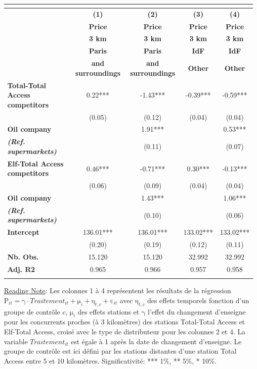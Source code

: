 \documentclass[english]{article}
\begin{document}
\begin{center}
\begin{footnotesize} %
\begin{tabular}{l|cccc}
\multicolumn{1}{l}{} &  &  &  & \tabularnewline
\hline
\hline
 & \textbf{(1)}  & \textbf{(2)}  & \textbf{(3)}  & \textbf{(4) }\tabularnewline
 & \textbf{Price}  & \textbf{Price}  & \textbf{Price}  & \textbf{Price}\tabularnewline
 & \textbf{3 km}  & \textbf{3 km}  & \textbf{3 km}  & \textbf{3 km}\tabularnewline
\hline
 & \textbf{Paris}  & \textbf{Paris}  & \textbf{IdF}  & \textbf{IdF}\tabularnewline
 & \textbf{and surroundings}  & \textbf{and surroundings}  & \textbf{Other}  & \textbf{Other}\tabularnewline
\hline
\textbf{Total-Total Access competitors}  & 0.22{*}{*}{*}  & -1.43{*}{*}{*}  & -0.39{*}{*}{*}  & -0.59{*}{*}{*}\tabularnewline
 & (0.05)  & (0.12)  & (0.04)  & (0.04)\tabularnewline
\textbf{Oil company}  &  & 1.91{*}{*}{*}  &  & 0.53{*}{*}{*}\tabularnewline
\textbf{\textit{(Ref. supermarkets)}}  &  & (0.11)  &  & (0.07)\tabularnewline
\hline
\textbf{Elf-Total Access competitors}  & 0.46{*}{*}{*}  & -0.71{*}{*}{*}  & 0.30{*}{*}{*}  & -0.13{*}{*}{*}\tabularnewline
 & (0.06)  & (0.09)  & (0.04)  & (0.04)\tabularnewline
\textbf{Oil company}  &  & 1.43{*}{*}{*}  &  & 1.06{*}{*}{*}\tabularnewline
\textbf{\textit{(Ref. supermarkets)}}  &  & (0.10)  &  & (0.06)\tabularnewline
\hline
\textbf{Intercept}  & 136.01{*}{*}{*}  & 136.01{*}{*}{*}  & 133.02{*}{*}{*}  & 133.02{*}{*}{*}\tabularnewline
 & (0.20)  & (0.19)  & (0.12)  & (0.11)\tabularnewline
\hline
\textbf{Nb. Obs.}  & 15.120  & 15.120  & 32.992  & 32.992\tabularnewline
\textbf{Adj. R2}  & 0.965  & 0.966  & 0.957  & 0.958\tabularnewline
\hline
\hline
\multicolumn{1}{l}{} &  &  &  & \tabularnewline
\end{tabular}\end{footnotesize}
\par\end{center}

{\small{}\uline{Reading Note}}{\small{}: }Les colonnes 1 à 4
représentent les résultats de la régression $\mathrm{P}_{it}=\mathrm{\gamma}\cdot Traitement_{it}+\mathrm{\mu}_{i}+\mathrm{\eta}_{t,c}+\mathrm{\varepsilon}_{it}$
avec $\mathrm{\eta}_{t,c}$ des effets temporels fonction d'un groupe
de contrôle $c$, $\mathrm{\mu}_{i}$ des effets stations et $\mathrm{\gamma}$
l'effet du changement d'enseigne pour les concurrents proches (à 3
kilomètres) des stations Total-Total Access et Elf-Total Access, croisé
avec le type de distributeur pour les colonnes 2 et 4. La variable
$Traitement_{it}$ est égale à 1 après la date de changement d'enseigne.
Le groupe de contrôle est ici défini par les stations distantes d'une
station Total Access entre 5 et 10 kilomètres. Significativité: {*}{*}{*}
1\%, {*}{*} 5\%, {*} 10\%.\medskip{}
\end{document}

